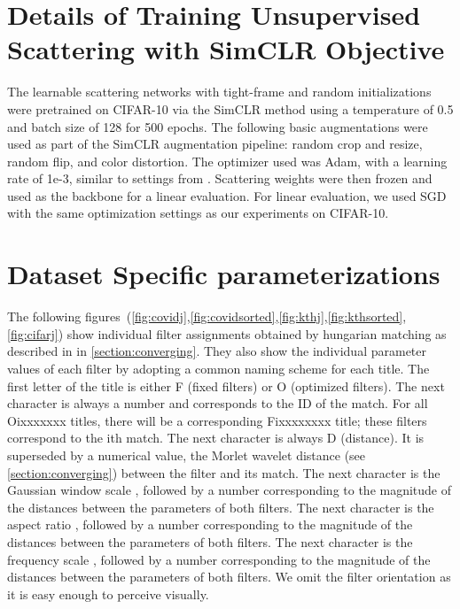 \documentclass[10pt,twocolumn,letterpaper]{article}
\begin{document}
\begin{table*}[t]
\section{Details of Training Unsupervised Scattering with SimCLR Objective}
\label{appendix:unsup}
The learnable scattering networks with tight-frame and random initializations were pretrained on CIFAR-10 via the SimCLR method using a temperature of 0.5 and batch size of 128 for 500 epochs. The following basic augmentations were used as part of the SimCLR augmentation pipeline: random crop and resize, random flip, and color distortion. The optimizer used was Adam, with a learning rate of 1e-3, similar to settings from \cite{chen2020simple}. Scattering weights were then frozen and used as the backbone for a linear evaluation. For linear evaluation, we used SGD with the same optimization settings as our experiments on CIFAR-10.

\section{Dataset Specific parameterizations}
\label{appendix-converging}

The following figures~(\ref{fig:covidj},\ref{fig:covidsorted},\ref{fig:kthj},\ref{fig:kthsorted},\ref{fig:cifarj}) show individual filter assignments obtained by hungarian matching as described in in \ref{section:converging}. They also show the individual parameter values of each filter by adopting a common naming scheme for each title. The first letter of the title is either F (fixed filters) or O (optimized filters). The next character is always a number and corresponds to the ID of the match. For all Oixxxxxxx titles, there will be a corresponding Fixxxxxxxx title; these filters correspond to the ith match. The next character is always D (distance). It is superseded by a numerical value, the Morlet wavelet distance (see \ref{section:converging}) between the filter and its match. The next character is the Gaussian window scale , followed by a number corresponding to the magnitude of the distances between the  parameters of both filters. The next character is the aspect ratio , followed by a number corresponding to the magnitude of the distances between the  parameters of both filters. The next character is the frequency scale , followed by a number corresponding to the magnitude of the distances between the  parameters of both filters. We omit the filter orientation  as it is easy enough to perceive visually.
\clearpage

\end{table*}
\end{document}
